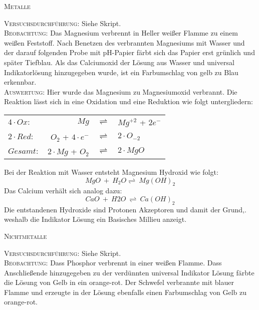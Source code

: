 \documentclass[11pt, a4paper]{article}
\begin{document}
\begin{center}
\textsc{Metalle}
\end{center}

\textsc{Versuchsdurchführung:} Siehe Skript.\\

\textsc{Beobachtung:}\hspace{5mm} Das Magnesium verbrennt in Heller weißer Flamme zu einem weißen Feststoff. Nach Benetzen des verbrannten Magnesiums mit Wasser und der darauf folgenden Probe mit pH-Papier färbt sich das Papier erst grünlich und später Tiefblau. Als das Calciumoxid der Lösung aus Wasser und universal Indikatorlösung hinzugegeben wurde, ist ein Farbumschlag von gelb zu Blau erkennbar.\\

\textsc{Auswertung:}\hspace{8mm} Hier wurde das Magnesium zu Magnesiumoxid verbrannt. Die Reaktion lässt sich in eine Oxidation und eine Reduktion wie folgt untergliedern: \\
\begin{center}
\begin{tabular}{lrcl}
$4\cdot Ox:$ & $Mg$ & $\rightleftharpoons$ & $Mg^{+2}$ + $2e^-$\\
$2\cdot Red:$ & $O_2$ + $4\cdot e^-$ & $\rightleftharpoons$ & $2\cdot O_{-2}$\\
$Gesamt:$ & $2\cdot Mg$ + $O_2$ & $\rightleftharpoons$ & $2\cdot MgO$\\
\end{tabular}
\end{center}
Bei der Reaktion mit Wasser entsteht Magnesium Hydroxid wie folgt: $$MgO\ +\ H_2O \rightleftharpoons\ Mg(OH)_2$$ Das Calcium verhält sich analog dazu: $$CaO\ +\ H2O\ \rightleftharpoons\ Ca(OH)_2$$ Die entstandenen Hydroxide sind Protonen Akzeptoren und damit der Grund,. weshalb die Indikator Lösung ein Basisches Millieu anzeigt.
\begin{center}
\textsc{Nichtmetalle}
\end{center}

\textsc{Versuchsdurchführung:} Siehe Skript.\\

\textsc{Beobachtung:}\hspace{5mm} Dass Phosphor verbrennt in einer weißen Flamme. Dass Anschließende hinzugegeben zu der verdünnten universal Indikator Lösung färbte die Lösung von Gelb in ein orange-rot. Der Schwefel verbrannte mit blauer Flamme und erzeugte in der Lösung ebenfalls einen Farbumschlag von Gelb zu orange-rot.\\
\end{document}
